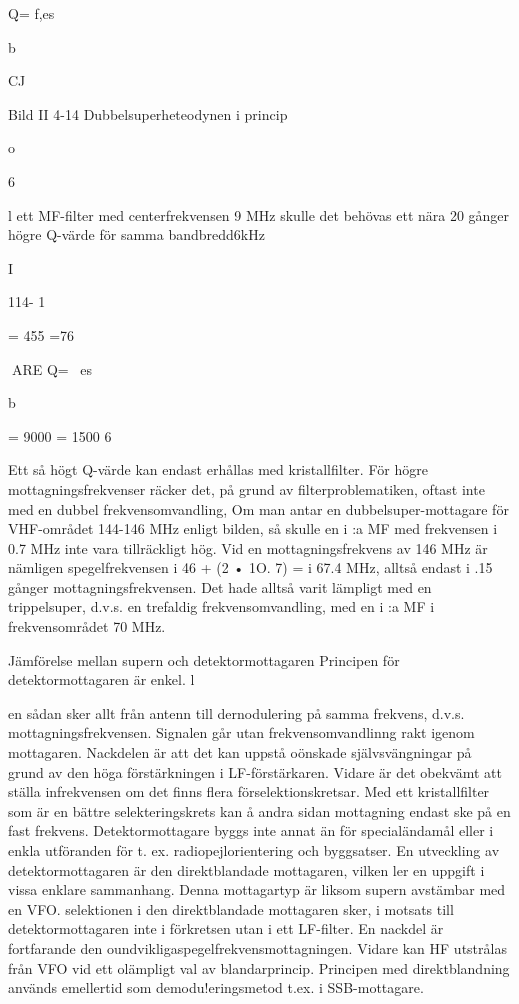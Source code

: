 Q= f,es

b

CJ

Bild II 4-14 Dubbelsuperheteodynen i princip

o

6

l ett MF-filter med centerfrekvensen 9
MHz skulle det behövas ett nära 20 gånger
högre Q-värde för samma bandbredd6kHz

I

114- 1

= 455 =76

ARE
Q= ~es

b

= 9000 = 1500
6

Ett så högt Q-värde kan endast erhållas
med kristallfilter.
För högre mottagningsfrekvenser räcker
det, på grund av filterproblematiken, oftast
inte med en dubbel frekvensomvandling,
Om man antar en dubbelsuper-mottagare
för VHF-området 144-146 MHz enligt bilden, så skulle en i :a MF med frekvensen
i 0.7 MHz inte vara tillräckligt hög. Vid en
mottagningsfrekvens av 146 MHz är nämligen spegelfrekvensen i 46 + (2 • 1O. 7) =
i 67.4 MHz, alltså endast i .15 gånger mottagningsfrekvensen. Det hade alltså varit
lämpligt med en trippelsuper, d.v.s. en trefaldig frekvensomvandling, med en i :a MF
i frekvensområdet 70 MHz.

Jämförelse mellan supern och detektormottagaren
Principen för detektormottagaren är enkel. l

en sådan sker allt från antenn till dernodulering på samma frekvens, d.v.s. mottagningsfrekvensen. Signalen går utan frekvensomvandlinng rakt igenom mottagaren. Nackdelen är att det kan uppstå oönskade självsvängningar på grund av den höga förstärkningen i LF-förstärkaren. Vidare är det obekvämt att ställa infrekvensen om det finns
flera förselektionskretsar. Med ett kristallfilter som är en bättre selekteringskrets kan å
andra sidan mottagning endast ske på en
fast frekvens. Detektormottagare byggs inte
annat än för specialändamål eller i enkla
utföranden för t. ex. radiopejlorientering och
byggsatser.
En utveckling av detektormottagaren är
den direktblandade mottagaren, vilken
ler en uppgift i vissa enklare sammanhang.
Denna mottagartyp är liksom supern avstämbar med en VFO.
selektionen i den direktblandade mottagaren sker, i motsats till detektormottagaren
inte i förkretsen utan i ett LF-filter. En nackdel är fortfarande den oundvikligaspegelfrekvensmottagningen. Vidare kan HF utstrålas från VFO vid ett olämpligt val av blandarprincip. Principen med direktblandning används emellertid som demodu!eringsmetod
t.ex. i SSB-mottagare.

